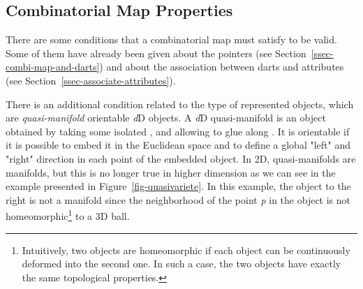 \subsection{Combinatorial Map Properties}\label{ssec-combimap-validity}
There are some conditions that a combinatorial map must satisfy to be
valid. Some of them have already been given about the \betats{} pointers
(see Section~\ref{ssec-combi-map-and-darts}) and about the association
between darts and attributes (see
Section~\ref{ssec-associate-attributes}).

There is an additional condition related to the type of represented
objects, which are \emph{quasi-manifold} orientable \emph{d}D objects.  A
\emph{d}D quasi-manifold is an object obtained by taking some isolated
, and allowing to glue  along . It is
orientable if it is possible to embed it in the Euclidean space and to
define a global "left" and "right" direction in each point of the
embedded object.  In 2D, quasi-manifolds are manifolds, but this is no
longer true in higher dimension as we can see in the example presented
in Figure~\ref{fig-quasivariete}.  In this example, the object to the
right is not a manifold since the neighborhood of the point \emph{p} in the
object is not homeomorphic\footnote{Intuitively, two objects are
  homeomorphic if each object can be continuously deformed into the
  second one.  In such a case, the two objects have exactly the same
  topological properties.}  to a 3D ball.
%
